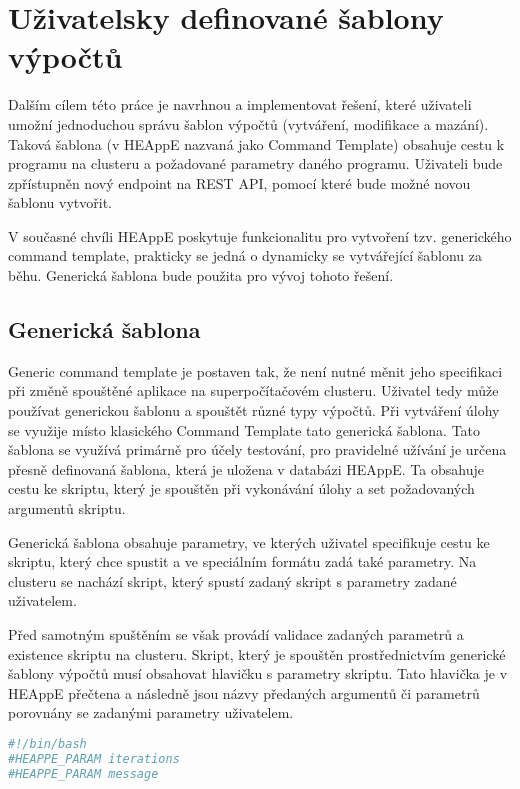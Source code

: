 \chapter{Uživatelsky definované šablony výpočtů}
Dalším cílem této práce je navrhnou a implementovat řešení, které uživateli umožní jednoduchou správu šablon výpočtů (vytváření, modifikace a mazání). Taková šablona (v HEAppE nazvaná jako Command Template) obsahuje cestu k programu na clusteru a požadované parametry daného programu. Uživateli bude zpřístupněn nový endpoint na REST API, pomocí které bude možné novou šablonu vytvořit.

V současné chvíli HEAppE poskytuje funkcionalitu pro vytvoření tzv. generického command template, prakticky se jedná o dynamicky se vytvářející šablonu za běhu. Generická šablona bude použita pro vývoj tohoto řešení.

\section{Generická šablona}
Generic command template je postaven tak, že není nutné měnit jeho specifikaci při změně spouštěné aplikace na superpočítačovém clusteru. Uživatel tedy může používat generickou šablonu a spouštět různé typy výpočtů. Při vytváření úlohy se využije místo klasického Command Template tato generická šablona. Tato šablona se využívá primárně pro účely testování, pro pravidelné užívání je určena přesně definovaná šablona, která je uložena v databázi HEAppE. Ta obsahuje cestu ke skriptu, který je spouštěn při vykonávání úlohy a set požadovaných argumentů skriptu.

Generická šablona obsahuje parametry, ve kterých uživatel specifikuje cestu ke skriptu, který chce spustit a ve speciálním formátu zadá také parametry. Na clusteru se nachází skript, který spustí zadaný skript s parametry zadané uživatelem.

Před samotným spuštěním se však provádí validace zadaných parametrů a existence skriptu na clusteru. Skript, který je spouštěn prostřednictvím generické šablony výpočtů musí obsahovat hlavičku s parametry skriptu. Tato hlavička je v HEAppE přečtena a následně jsou názvy předaných argumentů či parametrů porovnány se zadanými parametry uživatelem.

\newpage
\begin{lstlisting}[language=bash,caption={Ukázková hlavička skriptu s „generickými" parametry iterations a message}]
#!/bin/bash
#HEAPPE_PARAM iterations
#HEAPPE_PARAM message
\end{lstlisting}


